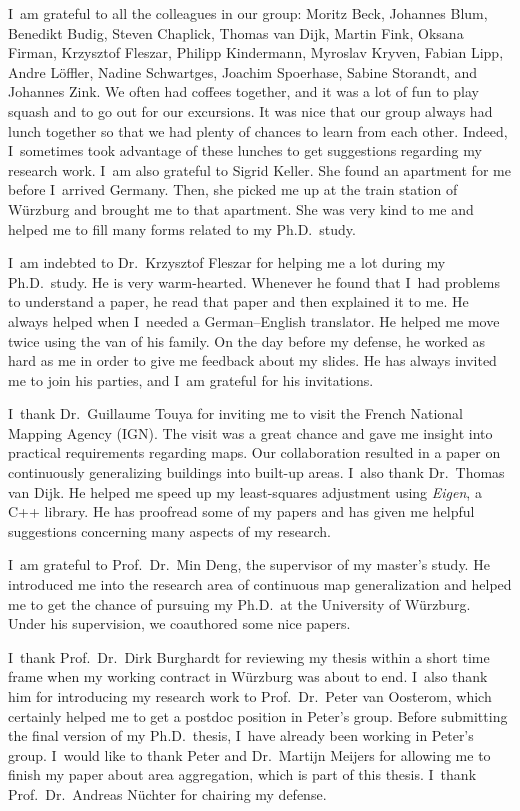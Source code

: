 I~am grateful to all the colleagues in our group:
Moritz Beck, Johannes Blum, Benedikt Budig, 
Steven Chaplick, Thomas van Dijk, 
Martin Fink, Oksana Firman, Krzysztof Fleszar, 
Philipp Kindermann, Myroslav Kryven, 
Fabian Lipp, Andre L\"offler, 
Nadine Schwartges, Joachim Spoerhase, Sabine Storandt, 
and Johannes Zink.
%
We often had coffees together,
and it was a lot of fun to play squash and to go out for our excursions.
It was nice that our group always had lunch together
so that we had plenty of chances to learn from each other.
Indeed, I~sometimes took advantage of these lunches
to get suggestions regarding my research work.
%
I~am also grateful to Sigrid Keller.
She found an apartment for me 
before I~arrived Germany.
Then, she picked me up at the train station of W\"urzburg
and brought me to that apartment.
She was very kind to me 
and helped me to fill many forms related to my Ph.D.\ study.


I~am indebted to Dr.\ Krzysztof Fleszar for 
helping me a lot during my Ph.D.\ study.
He is very warm-hearted.
Whenever he found that I~had problems to understand a paper,
he read that paper and then explained it to me.
He always helped when I~needed a German--English translator.
He helped me move twice using the van of his family.
On the day before my defense, he worked as hard as me
in order to give me feedback about my slides.
He has always invited me to join his parties, 
and I~am grateful for his invitations.

I~thank Dr.\ Guillaume Touya for inviting me to visit
the French National Mapping Agency (IGN).
The visit was a great chance and gave me insight into
practical requirements regarding maps.
Our collaboration resulted in a paper on continuously
generalizing buildings into built-up areas.
%
I~also thank Dr.\ Thomas van Dijk.
He helped me speed up my 
least-squares adjustment using \emph{Eigen}, a C++ library.
He has proofread some of my papers
and has given me helpful suggestions 
concerning many aspects of my research.

I~am grateful to Prof.\ Dr.\ Min Deng,
the supervisor of my master's study.
He introduced me into the research area of 
continuous map generalization 
and helped me to get the chance of
pursuing my Ph.D.\ at the University of W\"urzburg.
Under his supervision,
we coauthored some nice papers.


I~thank Prof.\ Dr.\ Dirk Burghardt 
for reviewing my thesis within a short time frame
when my working contract in W\"urzburg was about to end.
I~also thank him for introducing my research work to
Prof.\ Dr.\ Peter van Oosterom, 
which certainly helped me to get a postdoc position
in Peter's group.
Before submitting the final version of my Ph.D.\ thesis,
I~have already been working in Peter's group.
I~would like to thank Peter and Dr.\ Martijn Meijers 
for allowing me to finish my paper about area aggregation,
which is part of this thesis. 
I~thank Prof.\ Dr.\ Andreas N\"uchter for chairing my defense.

